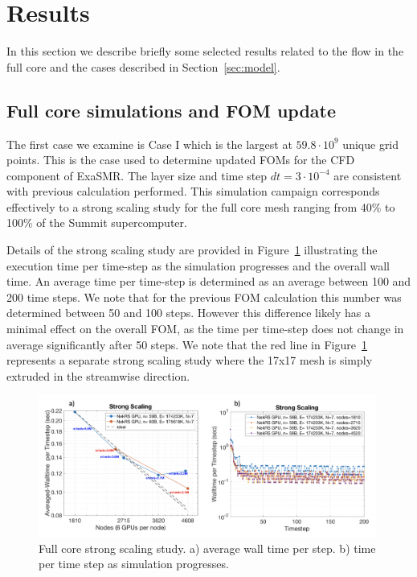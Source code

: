 \section{Results}
\label{sec:results}

In this section we describe briefly some selected results related to the flow in the full core and the cases described in Section~\ref{sec:model}.

\subsection{Full core simulations and FOM update}
\label{sec:results1}

The first case we examine is Case I which is the largest at $59.8 \cdot 10^{9}$ unique grid points. This is the case used to determine updated FOMs for the CFD component of ExaSMR. The layer size and time step $dt=3 \cdot 10^{-4}$ are consistent with previous calculation performed.  This simulation campaign corresponds effectively to a strong scaling study for the full core mesh ranging from 40\% to 100\% of the Summit supercomputer.

Details of the strong scaling study are provided in Figure~\ref{fig:strong} illustrating the execution time per time-step as the simulation progresses and the overall wall time. An average time per time-step is determined as an average between 100 and 200 time steps. We note that for the previous FOM calculation this number was determined between 50 and 100 steps. However this difference likely has a minimal effect on the overall FOM, as the time per time-step does not change in average significantly after 50 steps. We note that the red line in Figure~\ref{fig:strong}  represents a separate strong scaling study where the 17x17 mesh is simply extruded in the streamwise direction.

\begin{figure}[!ht]
\centering
\includegraphics[width=0.99\textwidth]{./figures/full_core_strong.png}
\caption{Full core strong scaling study. a) average wall time per step. b) time per time step as simulation progresses. }
\label{fig:strong}
\end{figure}

